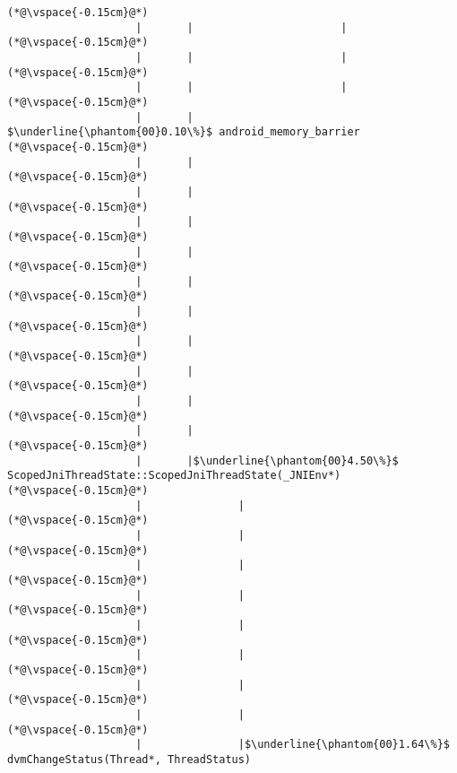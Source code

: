 \begin{lstlisting}[caption=Staattinen metodi C$\to$Java , label=profile:C2JBenchmark00001, numberbychapter=true, frame=lines, float, floatplacement=t]
(*@\vspace{-0.15cm}@*)
                    |       |                       |
(*@\vspace{-0.15cm}@*)
                    |       |                       |
(*@\vspace{-0.15cm}@*)
                    |       |                       |
(*@\vspace{-0.15cm}@*)
                    |       |                        $\underline{\phantom{00}0.10\%}$ android_memory_barrier
(*@\vspace{-0.15cm}@*)
                    |       |        
(*@\vspace{-0.15cm}@*)
                    |       |        
(*@\vspace{-0.15cm}@*)
                    |       |
(*@\vspace{-0.15cm}@*)
                    |       |
(*@\vspace{-0.15cm}@*)
                    |       |
(*@\vspace{-0.15cm}@*)
                    |       |
(*@\vspace{-0.15cm}@*)
                    |       |
(*@\vspace{-0.15cm}@*)
                    |       |
(*@\vspace{-0.15cm}@*)
                    |       |
(*@\vspace{-0.15cm}@*)
                    |       |
(*@\vspace{-0.15cm}@*)
                    |       |$\underline{\phantom{00}4.50\%}$ ScopedJniThreadState::ScopedJniThreadState(_JNIEnv*)
(*@\vspace{-0.15cm}@*)
                    |               |
(*@\vspace{-0.15cm}@*)
                    |               |
(*@\vspace{-0.15cm}@*)
                    |               |
(*@\vspace{-0.15cm}@*)
                    |               |
(*@\vspace{-0.15cm}@*)
                    |               |
(*@\vspace{-0.15cm}@*)
                    |               |
(*@\vspace{-0.15cm}@*)
                    |               |
(*@\vspace{-0.15cm}@*)
                    |               |
(*@\vspace{-0.15cm}@*)
                    |               |$\underline{\phantom{00}1.64\%}$ dvmChangeStatus(Thread*, ThreadStatus)

\end{lstlisting}
